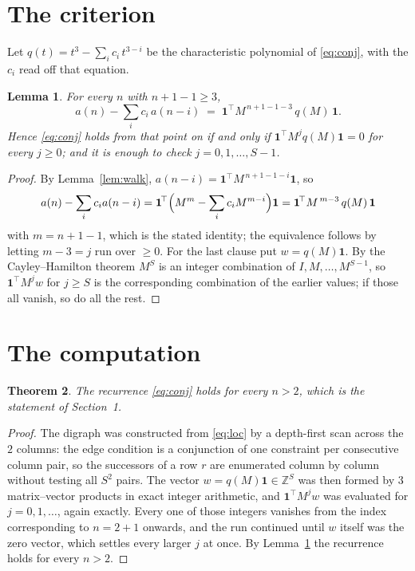\documentclass[11pt,a4paper]{article}
\theoremstyle{plain}
\newtheorem{theorem}{Theorem}
\newtheorem{lemma}[theorem]{Lemma}
\theoremstyle{definition}
\begin{document}
\section{The criterion}

Let $q(t)=t^{3}-\sum_i c_i\,t^{3-i}$ be the characteristic polynomial of
\eqref{eq:conj}, with the $c_i$ read off that equation.

\begin{lemma}\label{lem:crit}
For every $n$ with $n+1-1\ge3$,
\[
a(n)-\sum_i c_i\,a(n-i)\;=\;\mathbf{1}^{\!\top}M^{\,n+1-1-3}\,q(M)\,\mathbf{1} .
\]
Hence \eqref{eq:conj} holds from that point on if and only if
$\mathbf{1}^{\!\top}M^{j}q(M)\mathbf{1}=0$ for every $j\ge0$; and it is enough to check
$j=0,1,\dots,S-1$.
\end{lemma}

\begin{proof}
By Lemma~\ref{lem:walk}, $a(n-i)=\mathbf{1}^{\!\top}M^{\,n+1-1-i}\mathbf{1}$, so
\[
a(n)-\sum_i c_i a(n-i)
=\mathbf{1}^{\!\top}\Bigl(M^{m}-\sum_i c_i M^{m-i}\Bigr)\mathbf{1}
=\mathbf{1}^{\!\top}M^{\,m-3}\,q(M)\,\mathbf{1}
\]
with $m=n+1-1$, which is the stated identity; the equivalence follows by letting
$m-3=j$ run over $\ge0$. For the last clause put $w=q(M)\mathbf{1}$. By the
Cayley--Hamilton theorem $M^{S}$ is an integer combination of $I,M,\dots,M^{S-1}$, so
$\mathbf{1}^{\!\top}M^{j}w$ for $j\ge S$ is the corresponding combination of the earlier
values; if those all vanish, so do all the rest.
\end{proof}

\section{The computation}

\begin{theorem}
The recurrence \eqref{eq:conj} holds for every $n>2$, which is the statement of
Section~1.
\end{theorem}

\begin{proof}
The digraph was constructed from \eqref{eq:loc} by a depth-first scan across the $2$
columns: the edge condition is a conjunction of one constraint per consecutive column
pair, so the successors of a row $r$ are enumerated column by column without testing all
$S^2$ pairs. The vector $w=q(M)\mathbf{1}\in\mathbb{Z}^{S}$ was then formed by $3$
matrix--vector products in exact integer arithmetic, and $\mathbf{1}^{\!\top}M^{j}w$ was
evaluated for $j=0,1,\dots$, again exactly. Every one of those integers vanishes from the
index corresponding to $n=2+1$ onwards, and the run continued until $w$ itself was the
zero vector, which settles every larger $j$ at once. By Lemma~\ref{lem:crit} the recurrence
holds for every $n>2$.
\end{proof}
\end{document}
